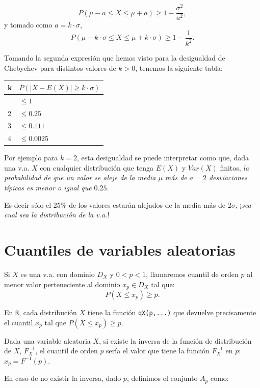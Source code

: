 \documentclass[
  letterpaper,
  DIV=11,
  numbers=noendperiod]{scrreprt}
\begin{document}
\[
P(\mu-a\leq X\leq \mu+a)\geq 1-\frac{\sigma^2}{a^2},
\] y tomado como \(a=k\cdot \sigma\), \[
P(\mu-k\cdot \sigma\leq X\leq \mu+ k \cdot \sigma)\geq 1-\frac1{k^2}.
\]

Tomando la segunda expresión que hemos visto para la desigualdad de
Chebychev para distintos valores de \(k>0\), tenemos la siguiente tabla:

\begin{longtable}[]{@{}ll@{}}
\toprule\noalign{}
k & \(P(|X-E(X)|\geq k \cdot \sigma)\) \\
\midrule\noalign{}
\endhead
\bottomrule\noalign{}
\endlastfoot
1 & \(\leq 1\) \\
2 & \(\leq 0.25\) \\
3 & \(\leq 0.111\) \\
4 & \(\leq 0.0025\) \\
\end{longtable}

Por ejemplo para \(k=2\), esta desigualdad se puede interpretar como
que, dada una v.a. \(X\) con cualquier distribución que tenga \(E(X)\) y
\(Var(X)\) finitos, \emph{la probabilidad de que un valor se aleje de la
media \(\mu\) más de \(a=2\) desviaciones típicas es menor o igual que
\(0.25\)}.

Es decir sólo el 25\% de los valores estarán alejados de la media más de
\(2\sigma\), ¡\emph{sea cual sea la distribución de la v.a.}!

\hypertarget{cuantiles-de-variables-aleatorias}{%
\section{Cuantiles de variables
aleatorias}\label{cuantiles-de-variables-aleatorias}}

Si \(X\) es una v.a. con dominio \(D_X\) y \(0<p<1\), llamaremos cuantil
de orden \(p\) al menor valor perteneciente al dominio \(x_p\in D_X\)
tal que: \[P(X\leq x_p)\geq p.\]

En \texttt{R}, cada distribución \(X\) tiene la función
\texttt{qX(p,...)} que devuelve precisamente el cuantil \(x_p\) tal que
\(P(X\leq x_p)\geq p.\)

Dada una variable aleatoria \(X\), si existe la inversa de la función de
distribución de \(X\), \(F_X^{-1}\), el cuantil de orden \(p\) sería el
valor que tiene la función \(F_X^{-1}\) en \(p\): \(x_p=F^{-1}(p)\).

En caso de no existir la inversa, dado \(p\), definimos el conjunto
\(A_p\) como:
\end{document}
